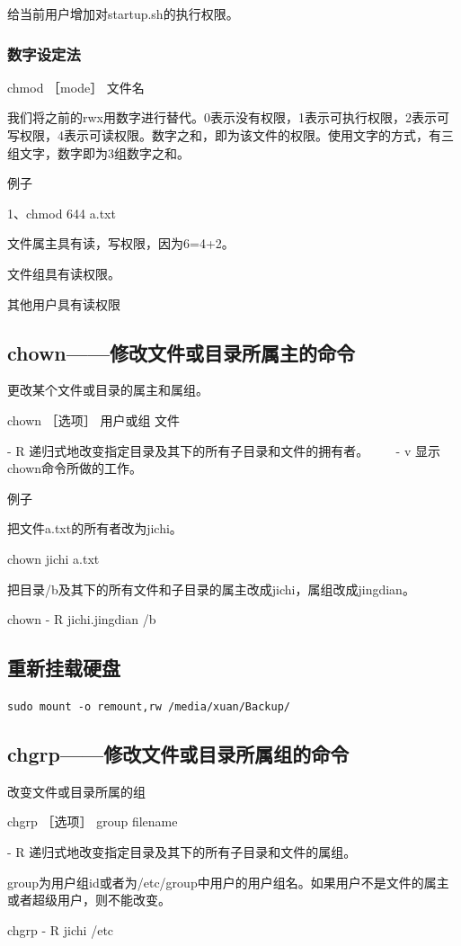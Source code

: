 给当前用户增加对startup.sh的执行权限。


\subsubsection{数字设定法}
chmod ［mode］ 文件名

我们将之前的rwx用数字进行替代。0表示没有权限，1表示可执行权限，2表示可写权限，4表示可读权限。数字之和，即为该文件的权限。使用文字的方式，有三组文字，数字即为3组数字之和。

例子

1、chmod 644 a.txt

文件属主具有读，写权限，因为6=4+2。

文件组具有读权限。

其他用户具有读权限


\subsection{chown——修改文件或目录所属主的命令}
更改某个文件或目录的属主和属组。

chown ［选项］ 用户或组 文件　　

- R 递归式地改变指定目录及其下的所有子目录和文件的拥有者。　
　
- v 显示chown命令所做的工作。　　

例子

把文件a.txt的所有者改为jichi。

chown jichi a.txt　　

把目录/b及其下的所有文件和子目录的属主改成jichi，属组改成jingdian。

chown - R jichi.jingdian /b


\subsection{重新挂载硬盘}
\verb|sudo mount -o remount,rw /media/xuan/Backup/|


\subsection{chgrp——修改文件或目录所属组的命令}
改变文件或目录所属的组

chgrp ［选项］ group filename

- R 递归式地改变指定目录及其下的所有子目录和文件的属组。

group为用户组id或者为/etc/group中用户的用户组名。如果用户不是文件的属主或者超级用户，则不能改变。

chgrp - R jichi /etc

